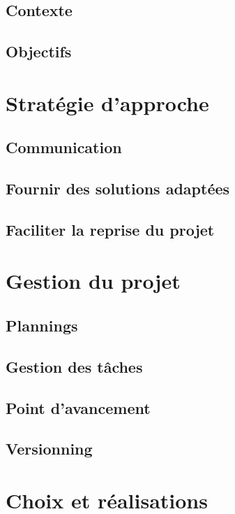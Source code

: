 \documentclass[UTF8]{EPURapport}
\begin{document}
\section{Contexte}

\section{Objectifs}

\chapter{Stratégie d'approche}

\section{Communication}

\section{Fournir des solutions adaptées}

\section{Faciliter la reprise du projet}

\chapter{Gestion du projet}

\section{Plannings}

\section{Gestion des tâches}

\section{Point d'avancement}

\section{Versionning}

\chapter{Choix et réalisations}
\end{document}
